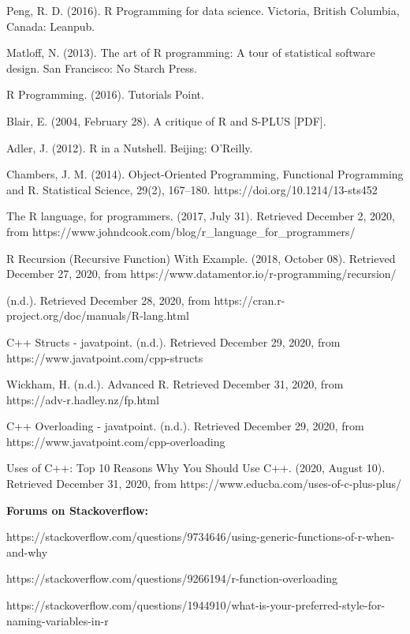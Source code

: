 \documentclass[12pt]{article}
\begin{document}
\newpage
\begin{thebibliography}{50}

Peng, R. D. (2016). R Programming for data science. Victoria, British Columbia, Canada: Leanpub.

Matloff, N. (2013). The art of R programming: A tour of statistical software design. San Francisco: No Starch Press.

R Programming. (2016). Tutorials Point.

Blair, E. (2004, February 28). A critique of R and S-PLUS [PDF].

Adler, J. (2012). R in a Nutshell. Beijing: O'Reilly.

Chambers, J. M. (2014). Object-Oriented Programming, Functional Programming and R. Statistical Science, 29(2), 167–180. https://doi.org/10.1214/13-sts452

The R language, for programmers. (2017, July 31). Retrieved December 2, 2020, from https://www.johndcook.com/blog/r\_language\_for\_programmers/

R Recursion (Recursive Function) With Example. (2018, October 08). Retrieved December 27, 2020, from https://www.datamentor.io/r-programming/recursion/

(n.d.). Retrieved December 28, 2020, from https://cran.r-project.org/doc/manuals/R-lang.html

C++ Structs - javatpoint. (n.d.). Retrieved December 29, 2020, from https://www.javatpoint.com/cpp-structs

Wickham, H. (n.d.). Advanced R. Retrieved December 31, 2020, from https://adv-r.hadley.nz/fp.html

C++ Overloading - javatpoint. (n.d.). Retrieved December 29, 2020, from https://www.javatpoint.com/cpp-overloading

Uses of C++: Top 10 Reasons Why You Should Use C++. (2020, August 10). Retrieved December 31, 2020, from https://www.educba.com/uses-of-c-plus-plus/

\textbf{Forums on Stackoverflow:}

https://stackoverflow.com/questions/9734646/using-generic-functions-of-r-when-and-why

https://stackoverflow.com/questions/9266194/r-function-overloading

https://stackoverflow.com/questions/1944910/what-is-your-preferred-style-for-naming-variables-in-r

\end{thebibliography}
\end{document}
